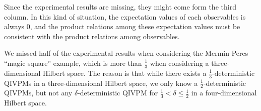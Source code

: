 \documentclass[english,reprint, aps, prl,superscriptaddress, showpacs,
showkeys, longbibliography, amsmath, amssymb, floatfix]{revtex4-1}
\theoremstyle{plain}
\theoremstyle{definition}
\begin{document}
\noindent Since the experimental results are missing, they might come
form the third column. In this kind of situation, the expectation
values of each observables is always $0$, and the product relations
among these expectation values must be consistent with the product
relations among observables.

We missed half of the experimental results when considering the Mermin-Peres
``magic square'' example, which is more than $\frac{1}{3}$ when
considering a three-dimensional Hilbert space. The reason is that
while there exists a $\frac{1}{3}$-deterministic QIVPMs in a three-dimensional
Hilbert space, we only know a $\frac{1}{2}$-deterministic QIVPMs,
but not any $\delta$-deterministic QIVPM for $\frac{1}{3}<\delta\le\frac{1}{2}$
in a four-dimensional Hilbert space.


\end{document}
